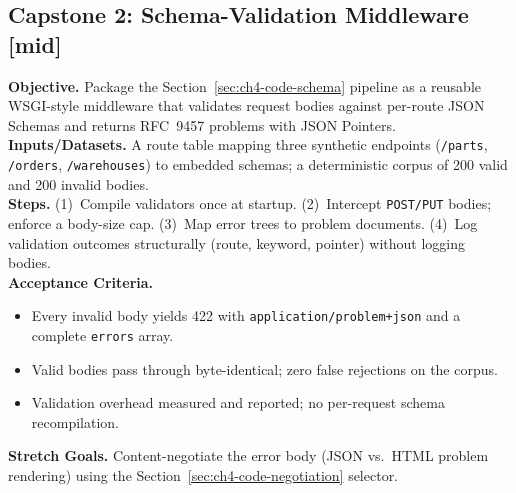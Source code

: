 \subsection{Capstone 2: Schema-Validation Middleware [mid]}
\textbf{Objective.} Package the Section~\ref{sec:ch4-code-schema} pipeline as a
reusable WSGI-style middleware that validates request bodies against per-route
JSON Schemas and returns RFC~9457 problems with JSON Pointers.\\
\textbf{Inputs/Datasets.} A route table mapping three synthetic endpoints
(\texttt{/parts}, \texttt{/orders}, \texttt{/warehouses}) to embedded schemas; a
deterministic corpus of 200 valid and 200 invalid bodies.\\
\textbf{Steps.} (1)~Compile validators once at startup. (2)~Intercept
\texttt{POST/PUT} bodies; enforce a body-size cap. (3)~Map error trees to
problem documents. (4)~Log validation outcomes structurally (route, keyword,
pointer) without logging bodies.\\
\textbf{Acceptance Criteria.}
\begin{itemize}
  \item[$\square$] Every invalid body yields 422 with \texttt{application/problem+json}
        and a complete \texttt{errors} array.
  \item[$\square$] Valid bodies pass through byte-identical; zero false rejections
        on the corpus.
  \item[$\square$] Validation overhead measured and reported; no per-request schema
        recompilation.
\end{itemize}
\textbf{Stretch Goals.} Content-negotiate the error body (JSON vs.\ HTML problem
rendering) using the Section~\ref{sec:ch4-code-negotiation} selector.

